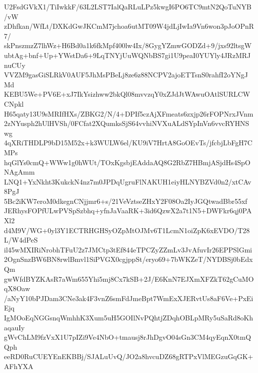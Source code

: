 U2FsdGVkX1/TiIwkkF/63L2LST7IalQaRLuLPz5kwgI6PO6TC9mtN2QoTuNYB/vW
zDhfkan/WfLt/DXKdGwJKCmM7jchoa6utMT09W4jdLjIwIa9Vn6won3pJoOPnR7/
skPnszmzZ7lhWz+H6Bd0a1k6fkMpf400lw4Ix/8GygYZmwGODZd+9/jxs92ltsgW
ubtAg+bnf+Up+YWstDa6+9LqTNYjUuWQNbBS7gi1U9peaI0YUYly4JRzMRJnuCUy
VVZM9gasGiSLRkV0AUF5JhMsPBeLj8ze6z88NCPV2ajoETTsnS0rahfI2oYNgJMd
KEBU5We+PV6E+xJ7IkYsizhww2bkQl08mvvzqY0xZJdJtWAwuOAtlSURLCWCNpkl
H65qaty13U9sMRIfHXs/ZBKG2/N/4+DPIf5czAjXFmeats6zxjp26rFOPNrxJVnm
2zNYusph2hUlHVSh/0FCfat2XQumksSjS64vvhiNVXuALdSYpInVn6vvcRYHNSwg
4qXRiTHDLP9bD15M52x+k3WULW6el/KU9iV7HrtA8GoOEvTs/jfcbjLbFgH7CMPs
hqGlYs0cmQ+WWw1g0hWUt/TOxKgsbjEAddaAQ8G2RbZ7HBmjASjdHs4SpONAgAmm
LNQ1+YxNkht3KukckN4nz7m0JPDqUgruFlNAKUH1eiyHLNYBZVd0n2/xtCAv8PgJ
5Bc2iKW7eroM0dkegnCNjjmr6+s/21VeVztseZHxY2F08Oa2IyJGQtwadBbr55xf
JERhysFOPfULwPVSpSzbhq+yfnJaVaaRK+3id6QzwX2a7t1N5+DWFkr6qj0PAXl2
d4M9V/WG+0yl3Y1ECTRHGHSyOZpMtOJMv6T1LcmN1oiZpK6xEVDO/T28L/W4dPeS
il45wMXIRiNrobhTFuU2z7JMCtp3tEf844eTPCZyZZmLv3JvAfuvIr26EPPSlGmi
2OgnSnzBW6BN8rwlBmvl1SiPVGX0cgjppSt/eryo69+7bWKZeT/NYDBSj0bEdxQm
gwWfdBYZKAsR7aWm655Yhi5mj8Cx7kSB+2J/E6KnN7EJXmXFZkT62gCuMOqX8Oaw
/aNyY10bPJDam3CNe3ak4F3vnZ6smFdJmeBpt7WmExXJERvtUs8aF6Ve+PxEiEjq
IgMOoEqNGGsnqWmhhK3Xum5uH5GOIlNvPQhtjZDqhOBLpMRy5uSaRd8oKhaqauIy
gWvChLM9fzVxX1U7pIZi9Ve4NbO+tmausj8rJhDgvO04sGn3CM4qyEqnX0tmQQph
eeRD0RuCUEYEnEKBBj/SJALuUvQ/JO2a8hvcuDZ68gRTPxVlMEGzuGqGK+AFhYXA
